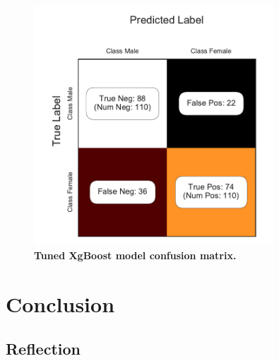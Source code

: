 \begin{figure}[!hbtp]
\centering
    \includegraphics[width=0.8\textwidth]{figures/tuned_model_CM}
    \caption{\textbf{Tuned XgBoost model confusion matrix. }\textit{}}\label{tuned_CM}
\end{figure}


\chapter*{Conclusion}



\section*{Reflection}

